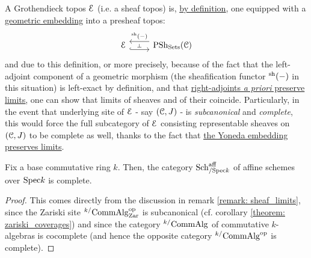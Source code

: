                     \begin{remark} \label{remark: sheaf_limits}
                        A Grothendieck topos $\mathcal{E}$ (i.e. a sheaf topos) is, \href{https://ncatlab.org/nlab/show/Grothendieck+topos#definition}{\underline{by definition}}, one equipped with a \href{https://ncatlab.org/nlab/show/geometric+embedding}{\underline{geometric embedding}} into a presheaf topos:
                            $$
                                \begin{tikzcd}
                                	\E & {\Psh_{\Sets}(\C)}
                                	\arrow[""{name=0, anchor=center, inner sep=0}, shift right=2, hook, from=1-1, to=1-2]
                                	\arrow[""{name=1, anchor=center, inner sep=0}, "{}^{\sh}(-)"', shift right=2, from=1-2, to=1-1]
                                	\arrow["\dashv"{anchor=center, rotate=-90}, draw=none, from=1, to=0]
                                \end{tikzcd}
                            $$
                        and due to this definition, or more precisely, because of the fact that the left-adjoint component of a geometric morphism (the sheafification functor ${}^{\mathrm{sh}}(-)$ in this situation) is left-exact by definition, and that \href{https://ncatlab.org/nlab/show/adjoints+preserve+\%28co-\%29limits}{\underline{right-adjoints \textit{a priori} preserve limits}}, one can show that limits of sheaves and of their  coincide. Particularly, in the event that  underlying site of $\mathcal{E}$ - say $(\mathcal{C}, J)$ - is \textit{subcanonical} and \textit{complete}, this would force the full subcategory of $\mathcal{E}$ consisting representable sheaves on $(\mathcal{C}, J)$ to be complete as well, thanks to the fact that \href{https://ncatlab.org/nlab/show/hom-functor+preserves+limits}{\underline{the Yoneda embedding preserves limits}}. 
                    \end{remark}
                    \begin{lemma} \label{lemma: affine_scheme_limits} 
                        Fix a base commutative ring $k$. Then, the category $\mathrm{Sch}^{\mathrm{aff}}_{/\mathrm{Spec} k}$ of affine schemes over $\mathrm{Spec} k$ is complete.
                    \end{lemma}
                        \begin{proof}
                            This comes directly from the discussion in remark \ref{remark: sheaf_limits}, since the Zariski site ${}^{k/}\mathrm{Comm}\mathrm{Alg}^{\mathrm{op}}_{\mathrm{Zar}}$ is subcanonical (cf. corollary \ref{theorem: zariski_coverages}) and since the category ${}^{k/}\mathrm{Comm}\mathrm{Alg}$ of commutative $k$-algebras is cocomplete (and hence the opposite category ${}^{k/}\mathrm{Comm}\mathrm{Alg}^{\mathrm{op}}$ is complete).
                        \end{proof}
                        
